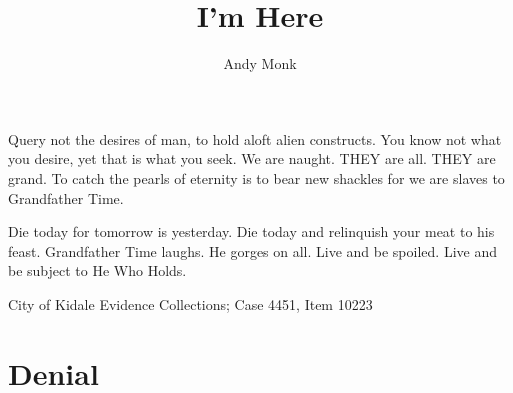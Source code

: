 \documentclass[9pt]{memoir}
\title{I'm Here}
\author{Andy Monk}
\date{}
\begin{document}
\clearpage
\maketitle
\thispagestyle{empty}




\frontmatter


\begin{displayquote}

    Query not the desires of man, to hold aloft alien constructs. You know not what you desire, yet that is what you seek. We are naught. THEY are all. THEY are grand. To catch the pearls of eternity is to bear new shackles for we are slaves to Grandfather Time.

    Die today for tomorrow is yesterday. Die today and relinquish your meat to his feast. Grandfather Time laughs. He gorges on all. Live and be spoiled. Live and be subject to He Who Holds.

\end{displayquote}

\begin{flushright}

    City of Kidale Evidence Collections; Case 4451, Item 10223 \hspace{2em}

\end{flushright}


\mainmatter

\chapter*{Denial}
\end{document}
